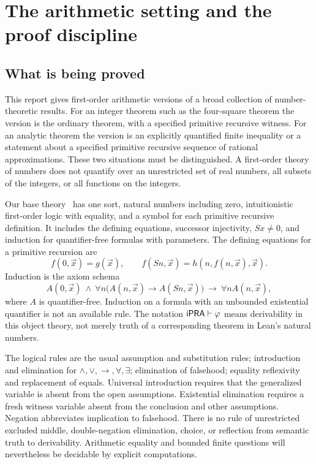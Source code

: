 \section{The arithmetic setting and the proof discipline}\label{sec:foundations}

\subsection{What is being proved}
This report gives first-order arithmetic versions of a broad collection of number-theoretic results. For an integer theorem such as the four-square theorem the version is the ordinary theorem, with a specified primitive recursive witness. For an analytic theorem the version is an explicitly quantified finite inequality or a statement about a specified primitive recursive sequence of rational approximations. These two situations must be distinguished. A first-order theory of numbers does not quantify over an unrestricted set of real numbers, all subsets of the integers, or all functions on the integers.

Our base theory \ipra\ has one sort, natural numbers including zero, intuitionistic first-order logic with equality, and a symbol for each primitive recursive definition. It includes the defining equations, successor injectivity, $Sx\ne0$, and induction for quantifier-free formulas with parameters. The defining equations for a primitive recursion are
\[
 f(0,\vec x)=g(\vec x),\qquad
 f(Sn,\vec x)=h(n,f(n,\vec x),\vec x).
\]
Induction is the axiom schema
\[
 A(0,\vec x)\ \wedge\ \forall n\bigl(A(n,\vec x)\to A(Sn,\vec x)\bigr)
 \ \longrightarrow\ \forall n A(n,\vec x),
\]
where $A$ is quantifier-free. Induction on a formula with an unbounded existential quantifier is not an available rule. The notation $\mathsf{iPRA}\vdash\varphi$ means derivability in this object theory, not merely truth of a corresponding theorem in Lean's natural numbers.

The logical rules are the usual assumption and substitution rules; introduction and elimination for $\wedge,\vee,\to,\forall,\exists$; elimination of falsehood; equality reflexivity and replacement of equals. Universal introduction requires that the generalized variable is absent from the open assumptions. Existential elimination requires a fresh witness variable absent from the conclusion and other assumptions. Negation abbreviates implication to falsehood. There is no rule of unrestricted excluded middle, double-negation elimination, choice, or reflection from semantic truth to derivability. Arithmetic equality and bounded finite questions will nevertheless be decidable by explicit computations.

